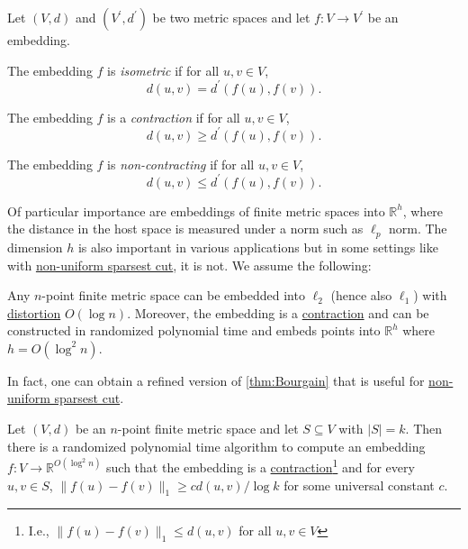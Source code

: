 \begin{definition*}
	Let \((V, d)\) and \((V^{\prime} , d^{\prime} )\) be two metric spaces and let \(f \colon V \to V^{\prime} \) be an embedding.
	\begin{definition}\label{def:isometric-embedding}
		The embedding \(f\) is \emph{isometric} if for all \(u, v \in V\),
		\[
			d(u, v) = d^{\prime} (f(u), f(v)).
		\]
	\end{definition}
	\begin{definition}[Contraction]\label{def:contraction}
		The embedding \(f\) is a \emph{contraction} if for all \(u, v \in V\),
		\[
			d(u, v) \geq d^{\prime} (f(u), f(v)).
		\]
	\end{definition}
	\begin{definition}\label{def:non-contracting}
		The embedding \(f\) is \emph{non-contracting} if for all \(u, v \in V\),
		\[
			d(u, v) \leq d^{\prime} (f(u), f(v)).
		\]
	\end{definition}
\end{definition*}

Of particular importance are embeddings of finite metric spaces into \(\mathbb{R} ^h\), where the distance in the host space is measured under a norm such as \(\ell _p\) norm. The dimension \(h\) is also important in various applications but in some settings like with \hyperref[prb:non-uniform-sparsest-cut]{non-uniform sparsest cut}, it is not. We assume the following:

\begin{theorem}\label{thm:Bourgain}
	Any \(n\)-point finite metric space can be embedded into \(\ell _2\) (hence also \(\ell _1\)) with \hyperref[def:distortion]{distortion} \(O(\log n)\). Moreover, the embedding is a \hyperref[def:contraction]{contraction} and can be constructed in randomized polynomial time and embeds points into \(\mathbb{R} ^h\) where \(h = O(\log ^2 n)\).
\end{theorem}

In fact, one can obtain a refined version of \autoref{thm:Bourgain} that is useful for \hyperref[prb:non-uniform-sparsest-cut]{non-uniform sparsest cut}.

\begin{theorem}\label{thm:Borugain*}
	Let \((V, d)\) be an \(n\)-point finite metric space and let \(S \subseteq V\) with \(\lvert S \rvert = k\). Then there is a randomized polynomial time algorithm to compute an embedding \(f \colon V \to \mathbb{R} ^{O(\log ^2 n)}\) such that the embedding is a \hyperref[def:contraction]{contraction}\footnote{I.e., \(\lVert f(u) - f(v) \rVert _1 \leq d(u, v)\) for all \(u, v \in V\)} and for every \(u, v \in S\), \(\lVert f(u) - f(v) \rVert _1 \geq c d(u, v) / \log k\) for some universal constant \(c\).
\end{theorem}

